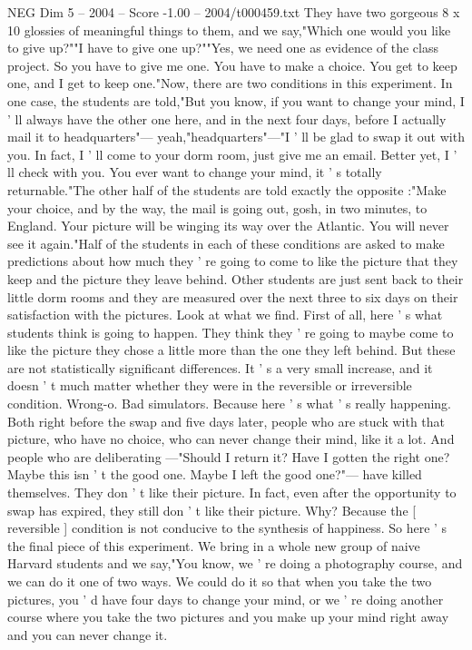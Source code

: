 \begin{textsample}{NEG Dim 5 – 2004 – Score -1.00 – 2004/t000459.txt}
They have two gorgeous 8 x 10 glossies of meaningful things to them, and we say,"Which one would you like to give up?""I have to give one up?""Yes, we need one as evidence of the class project.
So you have to give me one.
You have to make a choice.
You get to keep one, and I get to keep one."Now, there are two conditions in this experiment.
In one case, the students are told,"But you know, if you want to change your mind, I ' ll always have the other one here, and in the next four days, before I actually mail it to headquarters"— yeah,"headquarters"—"I ' ll be glad to swap it out with you.
In fact, I ' ll come to your dorm room, just give me an email.
Better yet, I ' ll check with you.
You ever want to change your mind, it ' s totally returnable."The other half of the students are told exactly the opposite :"Make your choice, and by the way, the mail is going out, gosh, in two minutes, to England.
Your picture will be winging its way over the Atlantic.
You will never see it again."Half of the students in each of these conditions are asked to make predictions about how much they ' re going to come to like the picture that they keep and the picture they leave behind.
Other students are just sent back to their little dorm rooms and they are measured over the next three to six days on their satisfaction with the pictures.
Look at what we find.
First of all, here ' s what students think is going to happen.
They think they ' re going to maybe come to like the picture they chose a little more than the one they left behind.
But these are not statistically significant differences.
It ' s a very small increase, and it doesn ' t much matter whether they were in the reversible or irreversible condition.
Wrong-o.
Bad simulators.
Because here ' s what ' s really happening.
Both right before the swap and five days later, people who are stuck with that picture, who have no choice, who can never change their mind, like it a lot.
And people who are deliberating —"Should I return it?
Have I gotten the right one?
Maybe this isn ' t the good one.
Maybe I left the good one?"— have killed themselves.
They don ' t like their picture.
In fact, even after the opportunity to swap has expired, they still don ' t like their picture.
Why?
Because the [ reversible ] condition is not conducive to the synthesis of happiness.
So here ' s the final piece of this experiment.
We bring in a whole new group of naive Harvard students and we say,"You know, we ' re doing a photography course, and we can do it one of two ways.
We could do it so that when you take the two pictures, you ' d have four days to change your mind, or we ' re doing another course where you take the two pictures and you make up your mind right away and you can never change it.

\end{textsample}
